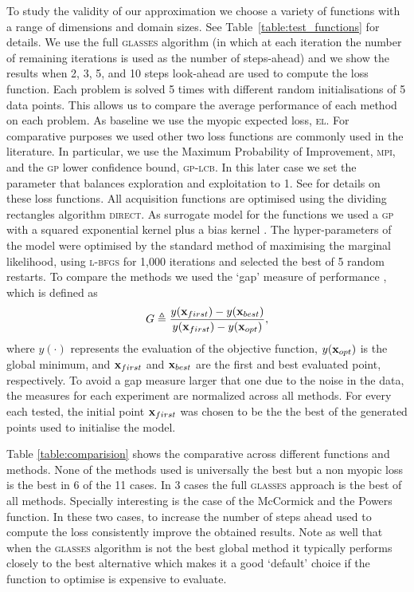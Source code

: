 \documentclass[twoside]{article}
\newcommand{\acr}[1]{\textsc{#1}\xspace}
\newcommand{\gp}{\acr{gp}}
\newcommand{\us}{\acr{glasses}}
\newcommand{\direct}{\acr{direct}}
\newcommand{\lbfgs}{\acr{l-bfgs}}
\newcommand{\mpi}{\acr{mpi}}
\newcommand{\el}{\acr{el}}
\newcommand{\lcb}{\acr{gp-lcb}}
\begin{document}
To study the validity of our approximation we choose a variety of functions with a range of dimensions and domain sizes. See Table~\ref{table:test_functions} for details. We use the full \us algorithm (in which at each iteration the number of remaining iterations is used as the number of steps-ahead) and we show the results when 2, 3, 5, and 10 steps look-ahead are used to compute the loss function. Each problem is solved 5 times with different random initialisations of 5 data points. This allows us to compare the average performance of each method on each problem. As baseline we use the myopic expected loss, \el. For comparative purposes we used other two loss functions are commonly used in the literature. In particular, we use the Maximum Probability of Improvement, \mpi, and the \gp lower confidence bound, \lcb. In this later case we set the parameter that balances exploration and exploitation to 1. See \citep{Snoek*Larochelle*Adams_2012} for details on these loss functions. All acquisition functions are optimised using the dividing rectangles algorithm \direct \citep{Jones1993}.
 As surrogate model for the functions we used a \gp with a squared exponential kernel plus a bias kernel \citep{Rasmussen:2005:GPM:1162254}. The hyper-parameters of the model were optimised by the standard method of maximising the marginal likelihood, using \lbfgs \citep{Nocedal1980} for 1,000 iterations and selected the best of 5 random restarts.
To compare the methods we used the `gap' measure of performance \citep{Huang:2006}, which is defined as
$$G \triangleq \frac{y(\mathbf{x}_{first})-y(\mathbf{x}_{best})}{y(\mathbf{x}_{first})-y(\mathbf{x}_{opt})},$$
where $y(\cdot)$ represents the evaluation of the objective function, $y(\mathbf{x}_{opt})$ is the global minimum, and $\mathbf{x}_{first}$ and $\mathbf{x}_{best}$ are the first and best evaluated point, respectively. To avoid a gap measure larger that one due to the noise in the data, the measures for each experiment are normalized across all methods. For every each tested, the initial point $\mathbf{x}_{first}$ was chosen to be the the best of the generated points used to initialise the model. 

Table \ref{table:comparision} shows the comparative across different functions and methods. None of the methods used is universally the best but a non myopic loss is the best in 6 of the 11 cases. In 3 cases the full \us approach is the best of all methods. Specially interesting is the case of the McCormick and the Powers function. In these two cases, to increase the number of steps ahead used to compute the loss consistently improve the obtained results. Note as well that when the \us algorithm is not the best global method it typically performs closely to the best alternative which makes it a good `default' choice if the function to optimise is expensive to evaluate.
\end{document}

